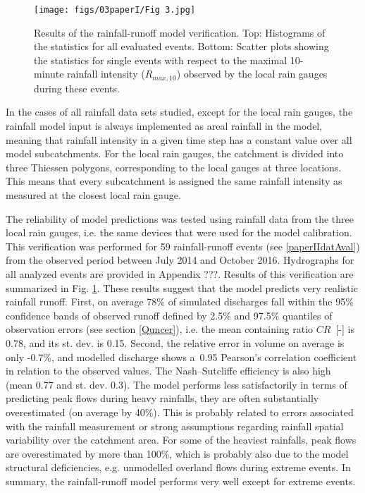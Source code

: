 \documentclass{ctuthesis}\usepackage[]{graphicx}\usepackage[]{color}
\begin{document}
\begin{figure}[h]
\begin{center}
\texttt{[image: figs/03paperI/Fig 3.jpg]}
\caption{Results of the rainfall-runoff model verification. Top: Histograms of the statistics for all evaluated events. Bottom: Scatter plots showing the statistics for single events with respect to the maximal 10-minute rainfall intensity ($R_{max,10}$) observed by the local rain gauges during these events.} \label{3fig3}
\end{center}
\end{figure}

In the cases of all rainfall data sets studied, except for the local rain gauges, the rainfall model input is always implemented as areal rainfall in the model, meaning that rainfall intensity in a given time step has a constant value over all model subcatchments. For the local rain gauges, the catchment is divided into three Thiessen polygons, corresponding to the local gauges at three locations. This means that every subcatchment is assigned the same rainfall intensity as measured at the closest local rain gauge.

The reliability of model predictions was tested using rainfall data from the three local rain gauges, i.e. the same devices that were used for the model calibration. This verification was performed for 59 rainfall-runoff events (see \ref{paperIIdatAval}) from the observed period between July 2014 and October 2016. Hydrographs for all analyzed events are provided in Appendix ???.  Results of this verification are summarized in Fig. \ref{3fig3}. These results suggest that the model predicts very realistic rainfall runoff. First, on average 78\% of simulated discharges fall within the 95\% confidence bands of observed runoff defined by 2.5\% and 97.5\% quantiles of observation errors (see section \ref{Quncer}), i.e. the mean containing ratio \mbox{$CR$~[-]} is 0.78, and its st. dev. is 0.15. Second, the relative error in volume on average is only -0.7\%, and modelled discharge shows a~0.95 Pearson's correlation coefficient in relation to the observed values. The Nash–Sutcliffe efficiency is also high (mean 0.77 and st. dev. 0.3). The model performs less satisfactorily in terms of predicting peak flows during heavy rainfalls, they are often substantially overestimated (on average by 40\%). This is probably related to errors associated with the rainfall measurement or strong assumptions regarding rainfall spatial variability over the catchment area. For some of the heaviest rainfalls, peak flows are overestimated by more than 100\%, which is probably also due to the model structural deficiencies, e.g. unmodelled overland flows during extreme events. In summary, the rainfall-runoff model performs very well except for extreme events. 
\end{document}
